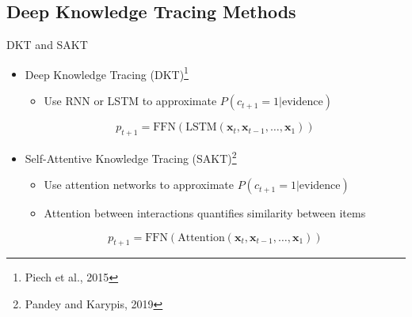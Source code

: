 \documentclass{beamer}
\def \R{\ensuremath \mathbb{R}}
\newcommand{\vect}[1]{\boldsymbol{#1}}
\theoremstyle{definition}
\begin{document}
\subsection{Deep Knowledge Tracing Methods}

\begin{frame}{DKT and SAKT}
  \begin{itemize}
    \item Deep Knowledge Tracing (DKT)\footnote{Piech et al., 2015}
      \begin{itemize}
        \item Use RNN or LSTM to approximate $P(c_{t+1} = 1 | \text{evidence})$
      \end{itemize}
          \[p_{t+1} = \text{FFN}(\text{LSTM}(\vect x_t, \vect x_{t-1},\ldots,\vect x_1))\]
          \smallskip
    \item<2-> Self-Attentive Knowledge Tracing (SAKT)\footnote{Pandey and Karypis, 2019}
      \begin{itemize}
        \item Use attention networks to approximate $P(c_{t+1} = 1 | \text{evidence})$
        \item Attention between interactions quantifies similarity between items
      \end{itemize}
          \[p_{t+1} = \text{FFN}(\text{Attention}(\vect x_t, \vect x_{t-1}, \ldots, \vect x_1))\]
  \end{itemize}
\end{frame}
\end{document}
